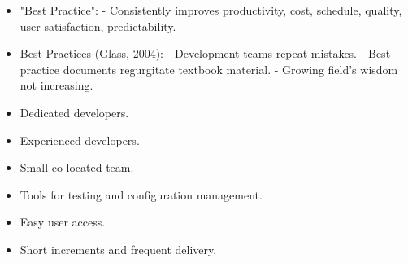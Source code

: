 \documentclass[10pt]{article}
\begin{document}
\begin{multicols}{5}
\begin{block}
\begin{itemize}
  \item "Best Practice":
    - Consistently improves productivity, cost, schedule, quality, user satisfaction, predictability.
  \item Best Practices (Glass, 2004):
    - Development teams repeat mistakes.
    - Best practice documents regurgitate textbook material.
    - Growing field’s wisdom not increasing.
\end{itemize}
\end{block}


\begin{block}
\begin{itemize}
  \item Dedicated developers.
  \item Experienced developers.
  \item Small co-located team.
  \item Tools for testing and configuration management.
  \item Easy user access.
  \item Short increments and frequent delivery.
\end{itemize}
\end{block}

\end{multicols}
\end{document}
